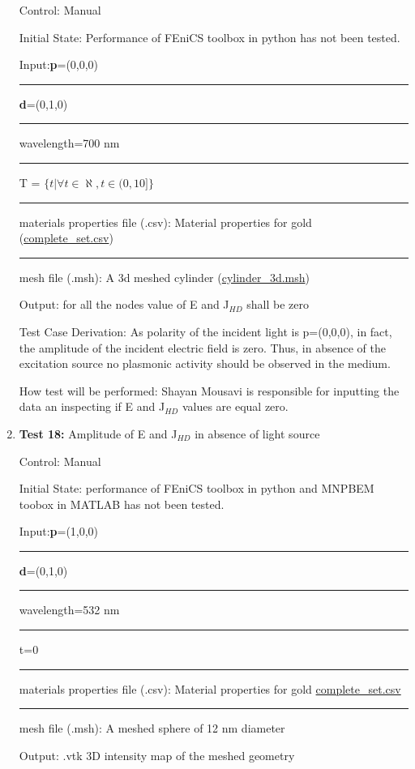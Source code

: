 \documentclass[12pt, titlepage]{article}
\begin{document}
\begin{enumerate}
Control: Manual 

Initial State: Performance of FEniCS toolbox in python has not been tested. 

Input:\textbf{p}=(0,0,0)\\
\rule{1.3cm}{0pt}\textbf{d}=(0,1,0)\\
\rule{1.3cm}{0pt}wavelength=700 nm\\ 
\rule{1.3cm}{0pt}T = $\{t| \forall t \in \aleph, t \in (0,10]\}$\\
\rule{1.3cm}{0pt}materials properties file (.csv): Material properties for gold (\href{https://github.com/shmouses/SPDFM/blob/master/src/TestCase/complete\_set.csv}{complete\_set.csv})\\
\rule{1.3cm}{0pt}mesh file (.msh): A 3d meshed cylinder (\href{https://github.com/shmouses/SPDFM/blob/master/src/TestCase/cylinder\_3d.msh}{cylinder\_3d.msh})

Output: for all the nodes value of E and J$_{HD}$ shall be zero 

Test Case Derivation: As polarity of the incident light is p=(0,0,0), in fact, the amplitude of the incident electric field is zero. Thus, in absence of the excitation source no plasmonic activity should be observed in the medium. 

How test will be performed: Shayan Mousavi is responsible for inputting the data an inspecting if E and J$_{HD}$ values are equal zero.  
\\
\item{\textbf{Test 18:} Amplitude of E and J$_{HD}$ in absence of light source\\}

Control: Manual 

Initial State:  performance of FEniCS toolbox in python and MNPBEM toobox in MATLAB has not been tested. 

Input:\textbf{p}=(1,0,0)\\
\rule{1.1cm}{0pt}\textbf{d}=(0,1,0)\\
\rule{1.1cm}{0pt}wavelength=532 nm\\ 
\rule{1.1cm}{0pt}t=0\\
\rule{1.1cm}{0pt}materials properties file (.csv): Material properties for gold  \href{https://github.com/shmouses/SPDFM/blob/master/src/TestCase/complete\_set.csv}{complete\_set.csv}\\
\rule{1.1cm}{0pt}mesh file (.msh): A meshed sphere of 12 nm diameter

Output: .vtk 3D intensity map of the meshed geometry


\end{enumerate}
\end{document}

